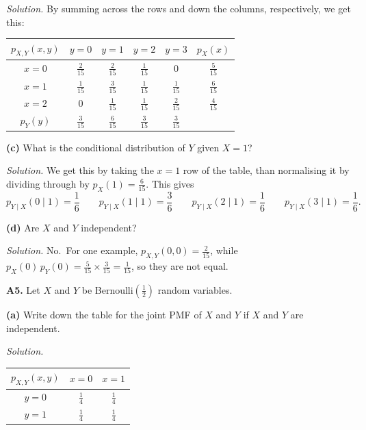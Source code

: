 \documentclass[
  a4paper,
]{book}
\theoremstyle{definition}
\theoremstyle{definition}
\theoremstyle{definition}
\theoremstyle{definition}
\theoremstyle{remark}
\begin{document}
\begin{myanswers}

\emph{Solution.}
By summing across the rows and down the columns, respectively, we get this:

\begin{longtable}[]{@{}cccccc@{}}
\toprule
\(p_{X,Y}(x,y)\) & \(y = 0\) & \(y = 1\) & \(y = 2\) & \(y = 3\) & \(p_X(x)\) \\
\midrule
\endhead
\(x=0\) & \(\frac{2}{15}\) & \(\frac{2}{15}\) & \(\frac{1}{15}\) & \(0\) & \(\frac{5}{15}\) \\
\(x=1\) & \(\frac{1}{15}\) & \(\frac{3}{15}\) & \(\frac{1}{15}\) & \(\frac{1}{15}\) & \(\frac{6}{15}\) \\
\(x=2\) & \(0\) & \(\frac{1}{15}\) & \(\frac{1}{15}\) & \(\frac{2}{15}\) & \(\frac{4}{15}\) \\
\(p_Y(y)\) & \(\frac{3}{15}\) & \(\frac{6}{15}\) & \(\frac{3}{15}\) & \(\frac{3}{15}\) & \\
\bottomrule
\end{longtable}

\end{myanswers}

\textbf{(c)} What is the conditional distribution of \(Y\) given \(X = 1\)?

\begin{myanswers}
\emph{Solution.} We get this by taking the \(x = 1\) row of the table, than normalising it by dividing through by \(p_X(1) = \frac{6}{15}\). This gives
\[ p_{Y\mid X} (0 \mid 1) = \frac{1}{6} \qquad p_{Y\mid X} (1 \mid 1) = \frac{3}{6} \qquad p_{Y\mid X} (2 \mid 1) = \frac{1}{6} \qquad p_{Y\mid X} (3 \mid 1) = \frac{1}{6} . \]

\end{myanswers}

\textbf{(d)} Are \(X\) and \(Y\) independent?

\begin{myanswers}
\emph{Solution.} No.~For one example, \(p_{X,Y}(0,0) = \frac{2}{15}\), while \(p_X(0) \, p_Y(0) = \frac{5}{15} \times \frac{3}{15} = \frac{1}{15}\), so they are not equal.

\end{myanswers}

\textbf{A5.} Let \(X\) and \(Y\) be Bernoulli\((\frac12)\) random variables.

\textbf{(a)} Write down the table for the joint PMF of \(X\) and \(Y\) if \(X\) and \(Y\) are independent.

\begin{myanswers}

\emph{Solution.}

\begin{longtable}[]{@{}ccc@{}}
\toprule
\(p_{X,Y}(x,y)\) & \(x = 0\) & \(x = 1\) \\
\midrule
\endhead
\(y = 0\) & \(\frac14\) & \(\frac14\) \\
\(y = 1\) & \(\frac14\) & \(\frac14\) \\
\bottomrule
\end{longtable}

\end{myanswers}
\end{document}
